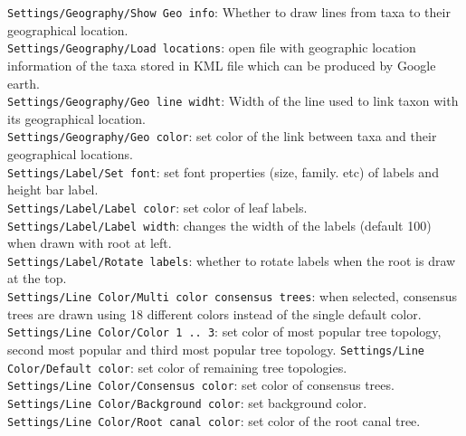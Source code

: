 \documentclass{article}
\begin{document}
\noindent
{\tt Settings/Geography/Show Geo info}: Whether to draw lines from taxa to their geographical location.\\
{\tt Settings/Geography/Load locations}: open file with geographic location information of the taxa stored in
KML file which can be produced by Google earth.\\
{\tt Settings/Geography/Geo line widht}: Width of the line used to link taxon with its geographical location.\\
{\tt Settings/Geography/Geo color}: set color of the link between taxa and their geographical locations.\\

\noindent
{\tt Settings/Label/Set font}: set font properties (size, family. etc) of labels and height bar label.\\
{\tt Settings/Label/Label color}: set color of leaf labels.\\
{\tt Settings/Label/Label width}: changes the width of the labels (default 100) when drawn with root at left.\\
{\tt Settings/Label/Rotate labels}: whether to rotate labels when the root is draw at the top.\\

\noindent
{\tt Settings/Line Color/Multi color consensus trees}: when selected, consensus trees are drawn using 18 different colors
instead of the single default color.\\
{\tt Settings/Line Color/Color 1 .. 3}: set color of most popular tree topology, second most popular and third most popular tree topology.
{\tt Settings/Line Color/Default color}: set color of remaining tree topologies.\\
{\tt Settings/Line Color/Consensus color}: set color of consensus trees.\\
{\tt Settings/Line Color/Background color}: set background color.\\
{\tt Settings/Line Color/Root canal color}: set color of the root canal tree.\\
%
\fi
\end{document}
